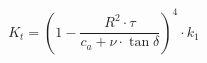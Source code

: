 \begin{equation}
    K_t
    =
    \left(
        1-
        \frac{R^2\cdot\tau}{c_a+\nu\cdot\tan\delta}
    \right)^4 \cdot k_1
    \label{Glg:Kt}
\end{equation}